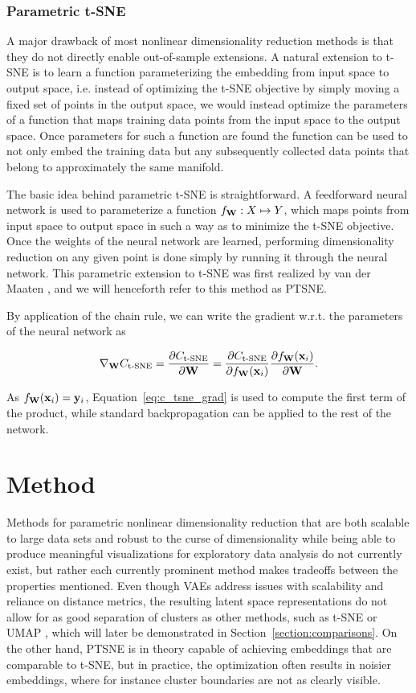 \subsection{Parametric t-SNE}
\label{subsection:parametric_tsne}

A major drawback of most nonlinear dimensionality reduction methods is that they do not directly enable out-of-sample extensions. A natural extension to t-SNE is to learn a function parameterizing the embedding from input space to output space, i.e. instead of optimizing the t-SNE objective by simply moving a fixed set of points in the output space, we would instead optimize the parameters of a function that maps training data points from the input space to the output space. Once parameters for such a function are found the function can be used to not only embed the training data but any subsequently collected data points that belong to approximately the same manifold.

The basic idea behind parametric t-SNE is straightforward. A feedforward neural network is used to parameterize a function $f_{\mathbf{W}}: X \mapsto Y$, which maps points from input space to output space in such a way as to minimize the t-SNE objective. Once the weights of the neural network are learned, performing dimensionality reduction on any given point is done simply by running it through the neural network. This parametric extension to t-SNE was first realized by van der Maaten \cite{parametric_tsne}, and we will henceforth refer to this method as PTSNE.

By application of the chain rule, we can write the gradient w.r.t. the parameters of the neural network as

$$\nabla_{\mathbf{W}} C_{\text{t-SNE}} = \frac{\partial C_{\text{t-SNE}}}{\partial \mathbf{W}} = \frac{\partial C_{\text{t-SNE}}}{\partial f_{\mathbf{W}}(\mathbf{x}_i)} \frac{\partial f_{\mathbf{W}}(\mathbf{x}_i)}{\partial \mathbf{W}}.$$

As $f_{\mathbf{W}}(\mathbf{x}_i) = \mathbf{y}_i$, Equation~\ref{eq:c_tsne_grad} is used to compute the first term of the product, while standard backpropagation can be applied to the rest of the network.

\chapter{Method}
\label{ch:method}

Methods for parametric nonlinear dimensionality reduction that are both scalable to large data sets and robust to the curse of dimensionality while being able to produce meaningful visualizations for exploratory data analysis do not currently exist, but rather each currently prominent method makes tradeoffs between the properties mentioned. Even though VAEs address issues with scalability and reliance on distance metrics, the resulting latent space representations do not allow for as good separation of clusters as other methods, such as t-SNE or UMAP \cite{umap}, which will later be demonstrated in Section~\ref{section:comparisons}. On the other hand, PTSNE is in theory capable of achieving embeddings that are comparable to t-SNE, but in practice, the optimization often results in noisier embeddings, where for instance cluster boundaries are not as clearly visible.

